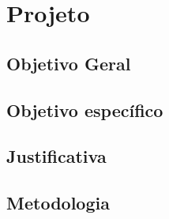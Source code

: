 \chapter{Projeto}

\section{Objetivo Geral}

\section{Objetivo específico}

\section{Justificativa}

\section{Metodologia}